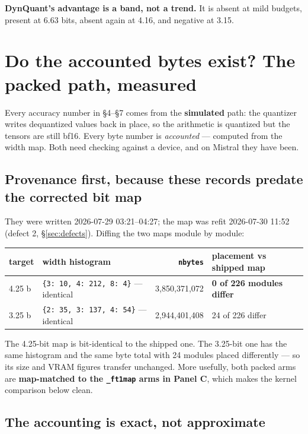 \documentclass[11pt]{article}
\newcommand{\code}[1]{\texttt{#1}}
\begin{document}
\textbf{DynQuant's advantage is a band, not a trend.} It is absent at mild budgets, present at
6.63 bits, absent again at 4.16, and negative at 3.15.

\section{Do the accounted bytes exist? The packed path, measured}
\label{sec:packed}

Every accuracy number in \S4--\S7 comes from the \textbf{simulated} path: the quantizer writes
dequantized values back in place, so the arithmetic is quantized but the tensors are still bf16.
Every byte number is \emph{accounted} --- computed from the width map. Both need checking against
a device, and on Mistral they have been.

\subsection{Provenance first, because these records predate the corrected bit map}

They were written 2026-07-29 03:21--04:27; the map was refit 2026-07-30 11:52 (defect 2,
\S\ref{sec:defects}). Diffing the two maps module by module:

\begin{center}\small
\begin{tabular}{@{}llrl@{}}
\toprule
target & width histogram & \code{nbytes} & placement vs shipped map \\
\midrule
4.25 b & \code{\{3: 10, 4: 212, 8: 4\}} --- identical & 3{,}850{,}371{,}072 & \textbf{0 of 226 modules differ} \\
3.25 b & \code{\{2: 35, 3: 137, 4: 54\}} --- identical & 2{,}944{,}401{,}408 & 24 of 226 differ \\
\bottomrule
\end{tabular}
\end{center}

The 4.25-bit map is bit-identical to the shipped one. The 3.25-bit one has the same histogram and
the same byte total with 24 modules placed differently --- so its size and VRAM figures transfer
unchanged. More usefully, both packed arms are \textbf{map-matched to the \code{\_ft1map} arms in
Panel C}, which makes the kernel comparison below clean.

\subsection{The accounting is exact, not approximate}
\end{document}
